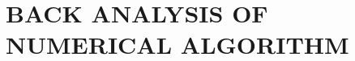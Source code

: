 \documentclass[../Dissertation]{subfiles}
\begin{document}
    \chapter[\uppercase{Back Analysis of Numerical Algorithm}]{\uppercase{Back Analysis of Numerical Algorithm}}\label{chp:4}
    
    
    \vspace{-2ex}
    
    
    
    
    
    
    
    
    
    \printbibliography[segment=\therefsegment,heading=references]
    
\end{document}
